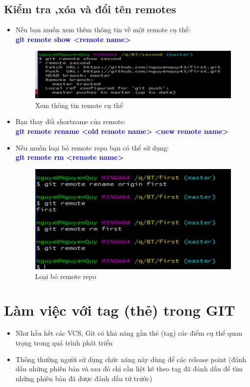 \documentclass[12pt,a4paper]{report}
\begin{document}
\subsection{Kiểm tra ,xóa và đổi tên remotes} 
\begin{itemize}
\item Nếu bạn muốn xem thêm thông tin về một remote cụ thể:\\ \textcolor{blue}{\bf git remote show <remote name>}

\begin{figure}[!ht]
	\centering	
	\includegraphics[width=0.8\linewidth]{screenshot040}
\caption{Xem thông tin remote cụ thể}
	\label{fig:screenshot040}
	\end{figure}

\item Bạn thay đổi shortname của remote:\\ \textcolor{blue}{\bf git remote rename <old remote name> <new remote name>}
\item Nếu muốn loại bỏ remote repo  bạn có thể sử dụng:\\ \textcolor{blue}{\bf git remote rm <remote name> }

\begin{figure}[!ht]
	\centering
	\includegraphics[width=0.8\linewidth]{screenshot041}
\caption{Loại bỏ remote repo}
	\label{fig:screenshot041}
	\end{figure}
\end{itemize}

			
\section{Làm việc với tag (thẻ) trong GIT}
\begin{itemize}
\item Như hầu hết các VCS, Git có khả năng gắn thẻ (tag) các điểm cụ thể quan trọng trong quá trình phát triển
\item Thông thường người sử dụng chức năng này dùng để các release point (đánh dấu những phiên bản và sau đó chỉ cần liệt kê theo tag đã đánh dấu để tìm những phiên bản đã được đánh dấu từ trước)
\end{itemize}
\end{document}
